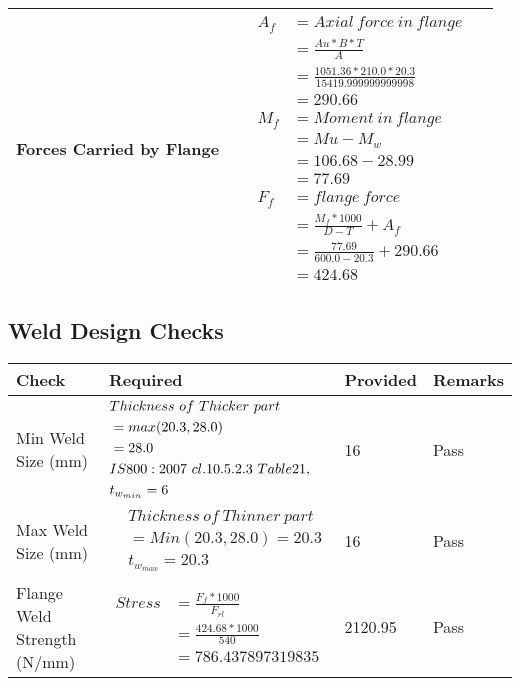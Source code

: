 \documentclass{article}%
\begin{document}
\begin{longtable}{|p{4cm}|p{5cm}|p{5.5cm}|p{1.5cm}|}
\hline%
Forces Carried by Flange&&$\begin{aligned} A_f&= Axial~force~ in ~flange  \\ &= \frac{Au * B *T}{A} \\ &= \frac{1051.36 * 210.0*20.3}{15419.999999999998} \\ &=290.66\\ M_f& =Moment~ in~ flange \\  & = Mu-M_w\\ &= 106.68-28.99\\ &=77.69\\  F_f& =flange~force  \\ & = \frac{M_f *1000}{D-T} + A_f \\ &= \frac{77.69}{600.0-20.3} +290.66 \\ &=424.68\end{aligned}$&\\%
\hline%
\end{longtable}

%
\newpage%
\subsection{Weld Design Checks}%
\label{subsec:WeldDesignChecks}%
\renewcommand{\arraystretch}{1.2}%
\begin{longtable}{|p{4cm}|p{5cm}|p{5.5cm}|p{1.5cm}|}%
\hline%
\rowcolor{OsdagGreen}%
Check&Required&Provided&Remarks\\%
\hline%
\endhead%
\hline%
Min Weld Size (mm)&$\begin{aligned} &Thickness~of~Thicker~part\\ \noindent &=max(20.3,28.0)\\ &=28.0\\ &IS800:2007~cl.10.5.2.3~Table 21,\\  &t_{w_{min}}=6\end{aligned}$&16&Pass\\%
\hline%
Max Weld Size (mm)&$\begin{aligned} & Thickness~of~Thinner~part\\ &=Min(20.3,28.0)=20.3\\ &t_{w_{max}} =20.3\end{aligned}$&16&Pass\\%
\hline%
Flange Weld Strength (N/mm)&$\begin{aligned} Stress &= \frac{F_f*1000}{F_{rl}}\\  &= \frac{424.68*1000}{540}\\ &= 786.437897319835\end{aligned}$&2120.95&Pass\\%
\hline%
\end{longtable}
\end{document}
